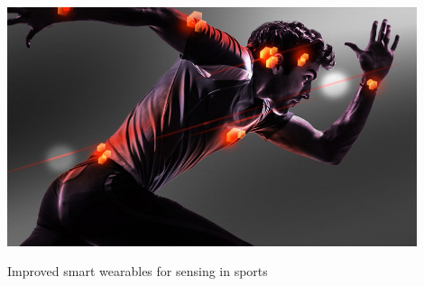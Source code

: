 \documentclass[sigconf]{acmart}
\begin{document}
%	
	
	
	\begin{teaserfigure}\centering
		\includegraphics[width=12cm]{Images/wearables.jpg}
		\caption{Improved smart wearables for sensing in sports \cite{Cruyff}}
		\label{fig:teaser}
	\end{teaserfigure}
	
\end{document}
